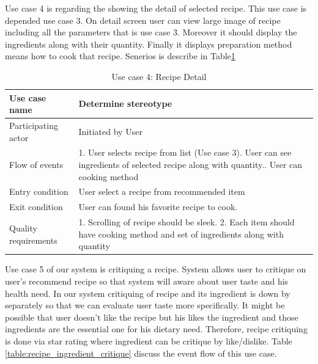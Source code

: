 Use case 4 is regarding the showing the detail of selected recipe. This use case is depended use case 3.  On detail screen user can view large image of recipe including all the parameters that is use case 3. Moreover it should display the ingredients along with their quantity. Finally it displays preparation method means how to cook that recipe. Senerios is describe in Table\ref{table:recipe_detail}
   \begin{table}[ht]
   	\centering %
   	\begin{tabular}{p{4cm} p{10cm}}  %
   		\hline\hline %
   		Use case name & Determine stereotype \\ %
   		\hline %
   		
   		Participating actor & Initiated by User \\ %
   		Flow of events & 1. User selects recipe from list (Use case 3)\newline 
   		2. User can see ingredients of selected recipe along with quantity.\newline
   		3. User can cooking method\\
   		Entry condition & User select a recipe from recommended item\\
   		Exit condition & User can found his favorite recipe to cook.\\
   		Quality requirements & 1. Scrolling of recipe should be sleek. 2. Each item should have cooking method and set of ingredients along with quantity\\ [1ex] %
   		\hline %
   	\end{tabular}
   	\caption{Use case 4: Recipe Detail}
   	\label{table:recipe_detail}
   \end{table}
   
   Use case 5 of our system is critiquing a recipe. System allows user to critique on user’s recommend recipe so that system will aware about user taste and his health need. In our system critiquing of recipe and its ingredient is down by separately so that we can evaluate user taste more specifically. It might be possible that user doesn’t like the recipe but his likes the ingredient and those ingredients are the essential one for his dietary need. Therefore, recipe critiquing is done via star rating where ingredient can be critique by like/dislike. Table \ref{table:recipe_ingredient_critique} discuss the event flow of this use case.
   
